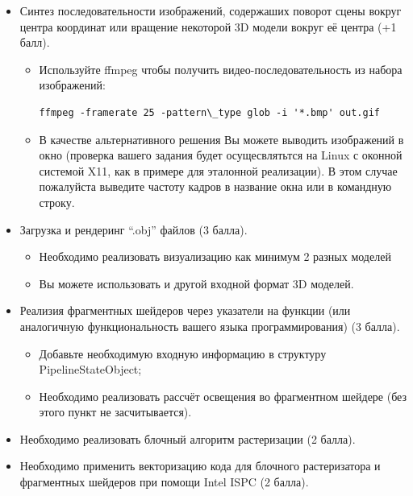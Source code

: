 \documentclass[12pt,subf,href,colorlinks=true]{article}
\begin{document}
\begin{itemize}
	
	\item Синтез последовательности изображений, содержаших поворот сцены вокруг центра координат или вращение некоторой 3D модели вокруг её центра (+1 балл). 
  
    \begin{itemize}
    \item Используйте ffmpeg чтобы получить видео-последовательность из набора изображений:
    \begin{verbatim}ffmpeg -framerate 25 -pattern\_type glob -i '*.bmp' out.gif \end{verbatim}
    
    \item В качестве альтернативного решения Вы можете выводить изображений в окно (проверка вашего задания будет осущесвлятьтся на Linux с оконной системой X11, как в примере для эталонной реализации). В этом случае пожалуйста выведите частоту кадров в название окна или в командную строку.
    \end{itemize}
    
	\item Загрузка и рендеринг ``.obj'' файлов (3 балла).
    \begin{itemize}
    	\item Необходимо реализовать визуализацию как минимум 2 разных моделей
    	\item Вы можете использовать и другой входной формат 3D моделей.
    \end{itemize}		
		
	\item Реализия фрагментных шейдеров через указатели на функции (или аналогичную функциональность вашего языка программирования) (3 балла).
	
	\begin{itemize}
	  \item Добавьте необходимую входную информацию в структуру PipelineStateObject;	
	  \item Необходимо реализовать рассчёт освещения во фрагментном шейдере (без этого пункт не засчитывается).
	\end{itemize}

    \item Необходимо реализовать блочный алгоритм растеризации (2 балла).
    
    \item Необходимо применить векторизацию кода для блочного растеризатора и фрагментных шейдеров при помощи Intel ISPC (2 балла).
    

\end{itemize}
\end{document}
